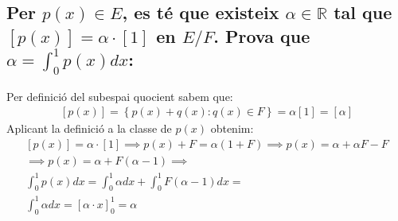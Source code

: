 \documentclass[a4paper, 11pt]{article}
\begin{document}
        \subsection{Per ${p(x) \in E}$, es t\'e que existeix ${\alpha \in \mathbb{R}}$ tal que ${\left[p(x)\right] = \alpha \cdot \left[1\right]}$ en ${E/F}$. Prova que ${\alpha = \int_0^1p(x)dx}$:}
            Per definici\'o del subespai quocient sabem que:
            \begin{align*}
                \left[p(x)\right] = \left\{p(x) + q(x): q(x)\in F\right\} = \alpha \left[1\right] = \left[\alpha\right]
            \end{align*}
            Aplicant la definici\'o a la classe de $p(x)$ obtenim:
            \begin{gather*}
                \left[p(x)\right] = \alpha \cdot \left[1\right] \implies p(x) + F = \alpha(1 + F) \implies p(x) = \alpha + \alpha F - F\\
                \implies p(x) = \alpha + F(\alpha -1) \implies\\ \int_0^1p(x)dx = \int_0^1\alpha dx + \int_0^1 F(\alpha-1)dx = \\
                \int_0^1\alpha dx = \left[\alpha \cdot x\right]_0^1 = \alpha
            \end{gather*}
\end{document}
